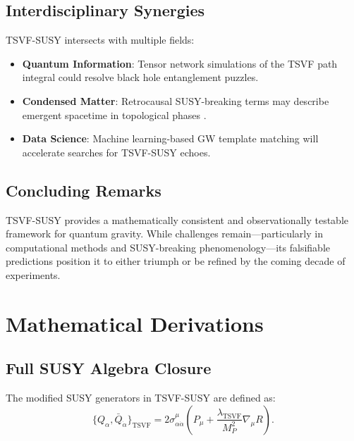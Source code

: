 \documentclass[twocolumn,superscriptaddress,floatfix]{revtex4-2}
\begin{document}
\subsection{Interdisciplinary Synergies}  
\label{subsec:interdisciplinary}  

TSVF-SUSY intersects with multiple fields:  
\begin{itemize}  
\item \textbf{Quantum Information}: Tensor network simulations \cite{Swingle2012} of the TSVF path integral could resolve black hole entanglement puzzles.  
\item \textbf{Condensed Matter}: Retrocausal SUSY-breaking terms may describe emergent spacetime in topological phases \cite{Vishwanath2015}.  
\item \textbf{Data Science}: Machine learning-based GW template matching \cite{George2018} will accelerate searches for TSVF-SUSY echoes.  
\end{itemize}  

\subsection{Concluding Remarks}  

TSVF-SUSY provides a mathematically consistent and observationally testable framework for quantum gravity. While challenges remain—particularly in computational methods and SUSY-breaking phenomenology—its falsifiable predictions position it to either triumph or be refined by the coming decade of experiments.  


\appendix
\section{Mathematical Derivations}
\label{app:derivations}


\subsection{Full SUSY Algebra Closure}
\label{app:susy}

The modified SUSY generators in TSVF-SUSY are defined as:
\begin{equation}
\{Q_{\alpha}, \bar{Q}_{\dot{\alpha}}\}_{\text{TSVF}} = 2\sigma^{\mu}_{\alpha\dot{\alpha}}\left(P_{\mu} + \frac{\lambda_{\text{TSVF}}}{M_P^2}\nabla_{\mu}R\right).
\end{equation}
\end{document}
